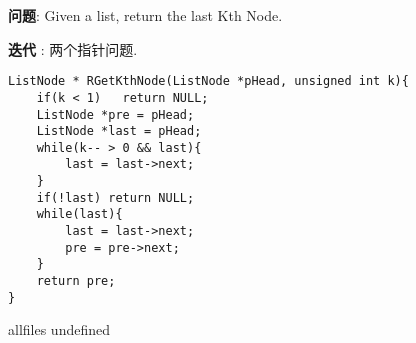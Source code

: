 \documentclass{article}
\begin{document}
\begin{CJK}{UTF8}{gbsn}     %

\else

\begin{description}
    \item{\textbf{问题}}: Given a list, return the last Kth Node.
    \item{\textbf{迭代}} : 
	两个指针问题.
    \begin{lstlisting}
ListNode * RGetKthNode(ListNode *pHead, unsigned int k){
	if(k < 1)	return NULL;
	ListNode *pre = pHead;
	ListNode *last = pHead;
	while(k-- > 0 && last){
		last = last->next;
	}
	if(!last) return NULL;
	while(last){
		last = last->next;
		pre = pre->next;
	}
	return pre;	
}
    \end{lstlisting}
\end{description}
\fi

\ifx allfiles undefined
\end{CJK}
\end{document}
